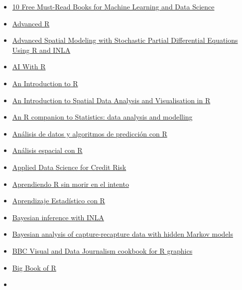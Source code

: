 \documentclass[
  letterpaper,
  DIV=11,
  numbers=noendperiod]{scrartcl}
\providecommand{\tightlist}{%
  \setlength{\itemsep}{0pt}\setlength{\parskip}{0pt}}
\begin{document}
\begin{itemize}
\tightlist
\item
  \href{https://www.kdnuggets.com/2017/04/10-free-must-read-books-machine-learning-data-science.html?utm_content=bufferc386f&utm_medium=social&utm_source=twitter.com&utm_campaign=buffer}{10
  Free Must-Read Books for Machine Learning and Data Science}
\item
  \href{https://adv-r.hadley.nz/index.html}{Advanced R}
\item
  \href{https://becarioprecario.bitbucket.io/spde-gitbook/}{Advanced
  Spatial Modeling with Stochastic Partial Differential Equations Using
  R and INLA}
\item
  \href{https://air.albert-rapp.de/}{AI With R}
\item
  \href{https://intro2r.com/}{An Introduction to R}
\item
  \href{https://www.spatialanalysisonline.com/An\%20Introduction\%20to\%20Spatial\%20Data\%20Analysis\%20in\%20R.pdf}{An
  Introduction to Spatial Data Analysis and Visualisation in R}
\item
  \href{https://mspeekenbrink.github.io/sdam-r-companion/index.html}{An
  R companion to Statistics: data analysis and modelling}
\item
  \href{http://rafalab.dfci.harvard.edu/dslibro/}{Análisis de datos y
  algoritmos de predicción con R}
\item
  \href{https://publicaciones.ciga.unam.mx/index.php/ec/catalog/book/306}{Análisis
  espacial con R}
\item
  \href{https://github.com/andrija-djurovic/adsfcr}{Applied Data Science
  for Credit Risk}
\item
  \href{https://aprendiendo-r-intro.netlify.app/}{Aprendiendo R sin
  morir en el intento}
\item
  \href{https://rubenfcasal.github.io/aprendizaje_estadistico/index.html}{Aprendizaje
  Estadístico con R}
\item
  \href{https://becarioprecario.bitbucket.io/inla-gitbook/index.html}{Bayesian
  inference with INLA}
\item
  \href{https://oliviergimenez.github.io/banana-book/}{Bayesian analysis
  of capture-recapture data with hidden Markov models}
\item
  \href{https://bbc.github.io/rcookbook/}{BBC Visual and Data Journalism
  cookbook for R graphics}
\item
  \href{https://www.bigbookofr.com/index.html}{Big Book of R}
\item

\end{itemize}
\end{document}
